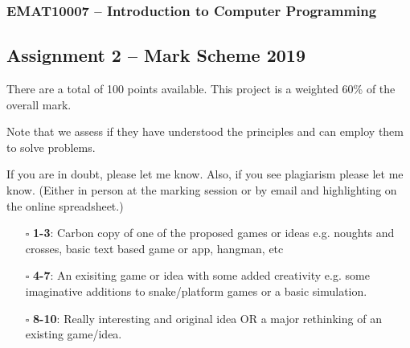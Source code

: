 \documentclass[11pt]{report}
\begin{document}
\subsubsection*{EMAT10007 -- Introduction to Computer Programming}
\subsection*{\Large Assignment 2 -- Mark Scheme 2019}

There are a total of 100 points available. This project is a weighted 60\% of the overall mark. 

\medskip

Note that we assess if they have understood the principles and can employ them to solve problems. 

\medskip

If you are in doubt, please let me know. Also, if you see plagiarism please let me know. (Either in person at the marking session or by email and highlighting on the online spreadsheet.)


\begin{Exercise}[title=Originality and creativity (10 marks)]
    \begin{itemize}
        \item [$\square$] \textbf{1-3}: Carbon copy of one of the proposed games or ideas e.g. noughts and crosses, basic text based game or app, hangman, etc
	    \item [$\square$]\textbf{4-7}: An exisiting game or idea with some added creativity e.g. some imaginative additions to snake/platform games or a basic simulation.
	    \item [$\square$]\textbf{8-10}: Really interesting and original idea OR a major rethinking of an existing game/idea. 
	\end{itemize}
\end{Exercise}
\end{document}

